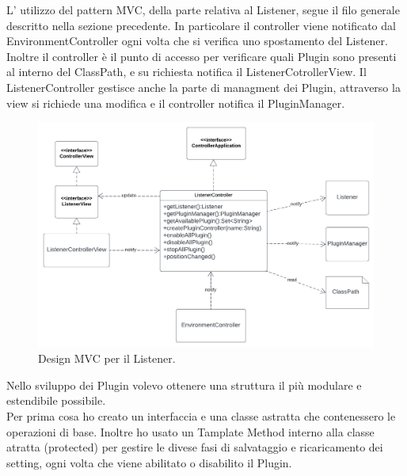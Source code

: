 \documentclass[a4paper,12pt]{report}
\begin{document}
%
L' utilizzo del pattern MVC, della parte relativa al Listener, segue il filo generale descritto nella sezione precedente. In particolare il controller viene notificato
dal EnvironmentController ogni volta che si verifica uno spostamento del Listener. Inoltre il controller è il punto di accesso per verificare quali Plugin sono presenti al interno del ClassPath, e su richiesta notifica il ListenerCotrollerView. Il ListenerController gestisce anche la parte di managment dei Plugin, attraverso la view si richiede una modifica e il controller notifica il PluginManager.

\begin{figure}[H]
\centering{}
\includegraphics[width=\textwidth]{img/listener/ListenerMVC.png}
\caption{Design MVC per il Listener.}
\label{img:Listener}
\end{figure}
%
Nello sviluppo dei Plugin volevo ottenere una struttura il più modulare e estendibile possibile.\\Per prima cosa ho creato un interfaccia e una classe astratta che contenessero le operazioni di base. Inoltre ho usato un Tamplate Method interno alla classe atratta (protected) per gestire le divese fasi di salvataggio e ricaricamento dei setting, ogni volta che viene abilitato o disabilito il Plugin.
\end{document}
